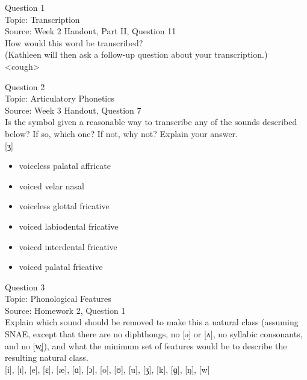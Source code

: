 \documentclass[12pt]{article}
\begin{document}
{\large Question 1}\\

Topic: Transcription\\
Source: Week 2 Handout, Part II, Question 11\\

How would this word be transcribed?\\ (Kathleen will then ask a follow-up question about your transcription.)\\

<cough>


\newpage

{\large Question 2}\\

Topic: Articulatory Phonetics\\
Source: Week 3 Handout, Question 7\\

Is the symbol given a reasonable way to transcribe any of the sounds described below? If so, which one? If not, why not? Explain your answer.\\

{[ʒ]}

\begin{itemize} \item voiceless palatal affricate \item voiced velar nasal \item voiceless glottal fricative \item voiced labiodental fricative \item voiced interdental fricative \item voiced palatal fricative \end{itemize}


\newpage

{\large Question 3}\\

Topic: Phonological Features\\
Source: Homework 2, Question 1\\

Explain which sound should be removed to make this a natural class (assuming SNAE, except that there are no diphthongs, no [ə] or [ʌ], no syllabic consonants, and no [w̥]), and what the minimum set of features would be to describe the resulting natural class.\\

{[i]}, {[ɪ]}, {[e]}, {[ɛ]}, {[æ]}, {[ɑ]}, {[ɔ]}, {[o]}, {[ʊ]}, {[u]}, {[ʒ]}, {[k]}, {[ɡ]}, {[ŋ]}, {[w]}
\end{document}
